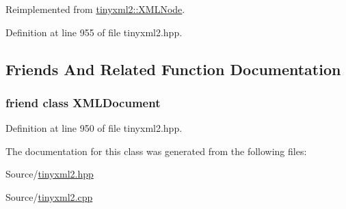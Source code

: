 Reimplemented from \hyperlink{classtinyxml2_1_1_x_m_l_node_a71f5ae90296dbe67979f83fe97073efa}{tinyxml2\-::\-X\-M\-L\-Node}.



Definition at line 955 of file tinyxml2.\-hpp.



\subsection{Friends And Related Function Documentation}
\hypertarget{classtinyxml2_1_1_x_m_l_unknown_a4eee3bda60c60a30e4e8cd4ea91c4c6e}{
\subsubsection[{X\-M\-L\-Document}]{\setlength{\rightskip}{0pt plus 5cm}friend class {\bf X\-M\-L\-Document}\hspace{0.3cm}{\ttfamily [friend]}}}\label{classtinyxml2_1_1_x_m_l_unknown_a4eee3bda60c60a30e4e8cd4ea91c4c6e}


Definition at line 950 of file tinyxml2.\-hpp.



The documentation for this class was generated from the following files\-:\begin{DoxyCompactItemize}
\item 
Source/\hyperlink{tinyxml2_8hpp}{tinyxml2.\-hpp}\item 
Source/\hyperlink{tinyxml2_8cpp}{tinyxml2.\-cpp}\end{DoxyCompactItemize}
